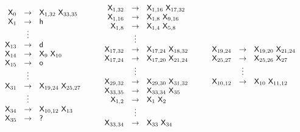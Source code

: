 \documentclass[runningheads]{llncs}
\newcommand{\sfX}{\ensuremath{\mathsf{X}}}
\begin{document}
\[\begin{array}{l@{\hspace{5ex}}l@{\hspace{5ex}}l}
\begin{array}{rcl}
\sfX_0 & \rightarrow & \sfX_{1, 32}\ \sfX_{33, 35}\\
\sfX_1 & \rightarrow & \mathsf{h}\\
& \vdots &\\
\sfX_{13} & \rightarrow & \mathsf{d}\\
\sfX_{14} & \rightarrow & \sfX_9\ \sfX_{10}\\
\sfX_{15} & \rightarrow & \mathsf{o}\\
& \vdots &\\
\sfX_{31} & \rightarrow & \sfX_{19, 24}\ \sfX_{25, 27}\\
& \vdots &\\
\sfX_{34} & \rightarrow & \sfX_{10, 12}\ \sfX_{13}\\
\sfX_{35} & \rightarrow & \mbox{\sf ?}
\end{array} &
\begin{array}{rcl}
\sfX_{1, 32} & \rightarrow & \sfX_{1, 16}\ \sfX_{17, 32}\\
\sfX_{1, 16} & \rightarrow & \sfX_{1, 8}\ \sfX_{9, 16}\\
\sfX_{1, 8} & \rightarrow & \sfX_{1, 4}\ \sfX_{5, 8}\\
& \vdots &\\
\sfX_{17, 32} & \rightarrow & \sfX_{17, 24}\ \sfX_{18, 32}\\
\sfX_{17, 24} & \rightarrow & \sfX_{17, 20}\ \sfX_{21, 24}\\
& \vdots &\\
\sfX_{29, 32} & \rightarrow & \sfX_{29, 30}\ \sfX_{31, 32}\\
\sfX_{33, 35} & \rightarrow & \sfX_{33, 34}\ \sfX_{35}\\
\sfX_{1, 2} & \rightarrow & \sfX_1\ \sfX_2\\
& \vdots &\\
\sfX_{33, 34} & \rightarrow & \sfX_{33}\ \sfX_{34}
\end{array} &
\begin{array}{rcl}
\sfX_{19, 24} & \rightarrow & \sfX_{19, 20}\ \sfX_{21, 24}\\
\sfX_{25, 27} & \rightarrow & \sfX_{25, 26}\ \sfX_{27}\\
& \vdots &\\
\sfX_{10, 12} & \rightarrow & \sfX_{10}\ \sfX_{11, 12}
\end{array}
\end{array}\]
\end{document}
